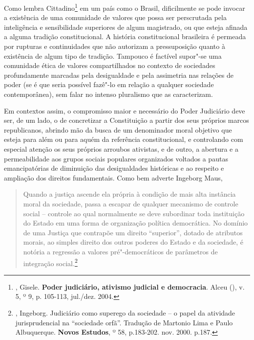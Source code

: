 Como lembra Cittadino\footnote{, Gisele. \textbf{Poder
  judiciário, ativismo judicial e democracia}. Alceu (), v. 5, º
  9, p. 105-113, jul./dez. 2004.} em um país como o Brasil, dificilmente
se pode invocar a existência de uma comunidade de valores que possa ser
perscrutada pela inteligência e sensibilidade superiores de algum
magistrado, ou que esteja afinada a alguma tradição constitucional. A
história constitucional brasileira é permeada por rupturas e
continuidades que não autorizam a pressuposição quanto à existência de
algum tipo de tradição. Tampouco é factível supor"-se uma comunidade
ética de valores compartilhados no contexto de sociedades profundamente
marcadas pela desigualdade e pela assimetria nas relações de poder (se é
que seria possível fazê"-lo em relação a qualquer sociedade
contemporânea), sem falar no intenso pluralismo que as caracterizam.

Em contextos assim, o compromisso maior e necessário do Poder Judiciário
deve ser, de um lado, o de concretizar a Constituição a partir dos seus
próprios marcos republicanos, abrindo mão da busca de um denominador
moral objetivo que esteja para além ou para aquém da referência
constitucional, e controlando com especial atenção os seus próprios
arroubos ativistas, e de outro, a abertura e a permeabilidade aos grupos
sociais populares organizados voltados a pautas emancipatórias de
diminuição das desigualdades históricas e ao respeito e ampliação dos
direitos fundamentais. Como bem adverte Ingeborg Maus,

\begin{quote}
Quando a justiça ascende ela própria à condição de mais alta instância
moral da sociedade, passa a escapar de qualquer mecanismo de controle
social -- controle ao qual normalmente se deve subordinar toda
instituição do Estado em uma forma de organização política democrática.
No domínio de uma Justiça que contrapõe um direito ``superior'', dotado de
atributos morais, ao simples direito dos outros poderes do Estado e da
sociedade, é notória a regressão a valores pré"-democráticos de
parâmetros de integração social.\footnote{, Ingeborg. Judiciário
  como superego da sociedade -- o papel da atividade jurisprudencial na
  ``sociedade orfã''. Tradução de Martonio Lima e Paulo Albuquerque.
  \textbf{Novos Estudos}, º 58, p.183-202. nov. 2000. p.187.}
\end{quote}

